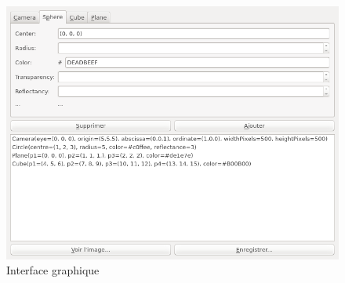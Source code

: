 \documentclass[a4paper]{article}
\begin{document}
    \begin{figure}[p]
      \centerline{\includegraphics[width=1.2\textwidth]{gui.png}}
    \caption{Interface graphique\label{fig:gui}}
    \end{figure}
\end{document}
